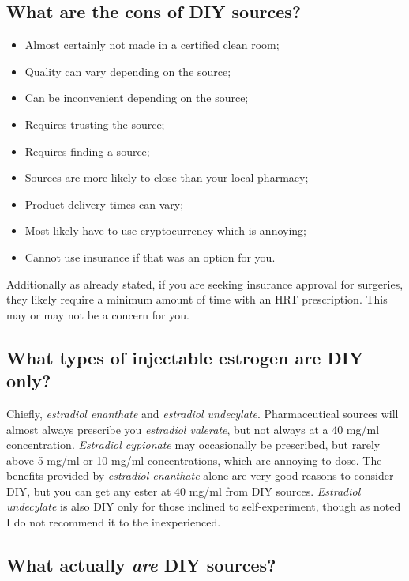 \documentclass{article}
\begin{document}
\subsection{What are the cons of DIY sources?}

\begin{itemize}
  \item Almost certainly not made in a certified clean room;
  \item Quality can vary depending on the source;
  \item Can be inconvenient depending on the source;
  \item Requires trusting the source;
  \item Requires finding a source;
  \item Sources are more likely to close than your local pharmacy;
  \item Product delivery times can vary;
  \item Most likely have to use cryptocurrency which is annoying;
  \item Cannot use insurance if that was an option for you.
\end{itemize}
Additionally as already stated, if you are seeking insurance approval for surgeries, they likely require a minimum amount of time with an HRT prescription. This may or may not be a concern for you.

\subsection{What types of injectable estrogen are DIY only?}

Chiefly, \textit{estradiol enanthate} and \textit{estradiol undecylate}. Pharmaceutical sources will almost always prescribe you \textit{estradiol valerate}, but not always at a 40 mg/ml concentration. \textit{Estradiol cypionate} may occasionally be prescribed, but rarely above 5 mg/ml or 10 mg/ml concentrations, which are annoying to dose. The benefits provided by \textit{estradiol enanthate} alone are very good reasons to consider DIY, but you can get any ester at 40 mg/ml from DIY sources. \textit{Estradiol undecylate} is also DIY only for those inclined to self-experiment, though as noted I do not recommend it to the inexperienced.

\subsection{What actually \textit{are} DIY sources?}
\end{document}
